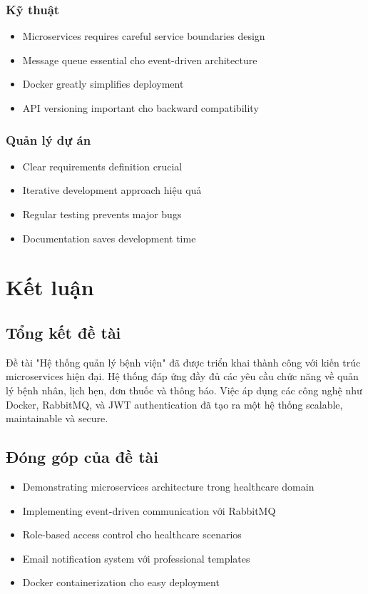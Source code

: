\documentclass[12pt,a4paper]{report}
\begin{document}
\subsection{Kỹ thuật}
\begin{itemize}
    \item Microservices requires careful service boundaries design
    \item Message queue essential cho event-driven architecture
    \item Docker greatly simplifies deployment
    \item API versioning important cho backward compatibility
\end{itemize}

\subsection{Quản lý dự án}
\begin{itemize}
    \item Clear requirements definition crucial
    \item Iterative development approach hiệu quả
    \item Regular testing prevents major bugs
    \item Documentation saves development time
\end{itemize}

\chapter{Kết luận}

\section{Tổng kết đề tài}
Đề tài "Hệ thống quản lý bệnh viện" đã được triển khai thành công với kiến trúc microservices hiện đại. Hệ thống đáp ứng đầy đủ các yêu cầu chức năng về quản lý bệnh nhân, lịch hẹn, đơn thuốc và thông báo. Việc áp dụng các công nghệ như Docker, RabbitMQ, và JWT authentication đã tạo ra một hệ thống scalable, maintainable và secure.

\section{Đóng góp của đề tài}
\begin{itemize}
    \item Demonstrating microservices architecture trong healthcare domain
    \item Implementing event-driven communication với RabbitMQ
    \item Role-based access control cho healthcare scenarios
    \item Email notification system với professional templates
    \item Docker containerization cho easy deployment
\end{itemize}
\end{document}
